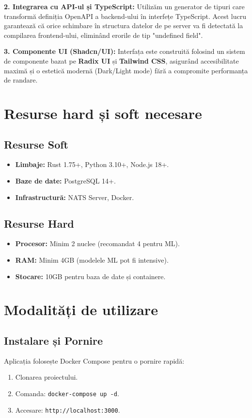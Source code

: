 \documentclass[12pt,a4paper]{article}
\begin{document}
	\textbf{2. Integrarea cu API-ul și TypeScript:}
	Utilizăm un generator de tipuri care transformă definiția OpenAPI a backend-ului în interfețe TypeScript. Acest lucru garantează că orice schimbare în structura datelor de pe server va fi detectată la compilarea frontend-ului, eliminând erorile de tip "undefined field".
	
	\textbf{3. Componente UI (Shadcn/UI):}
	Interfața este construită folosind un sistem de componente bazat pe \textbf{Radix UI} și \textbf{Tailwind CSS}, asigurând accesibilitate maximă și o estetică modernă (Dark/Light mode) fără a compromite performanța de randare.
	
	\newpage
	
	\section{Resurse hard și soft necesare}
	
	\subsection{Resurse Soft}
	\begin{itemize}
		\item \textbf{Limbaje:} Rust 1.75+, Python 3.10+, Node.js 18+.
		\item \textbf{Baze de date:} PostgreSQL 14+.
		\item \textbf{Infrastructură:} NATS Server, Docker.
	\end{itemize}
	
	\subsection{Resurse Hard}
	\begin{itemize}
		\item \textbf{Procesor:} Minim 2 nuclee (recomandat 4 pentru ML).
		\item \textbf{RAM:} Minim 4GB (modelele ML pot fi intensive).
		\item \textbf{Stocare:} 10GB pentru baza de date și containere.
	\end{itemize}
	
	\section{Modalități de utilizare}
	
	\subsection{Instalare și Pornire}
	Aplicația folosește Docker Compose pentru o pornire rapidă:
	\begin{enumerate}
		\item Clonarea proiectului.
		\item Comanda: \texttt{docker-compose up -d}.
		\item Accesare: \texttt{http://localhost:3000}.
	\end{enumerate}
	
\end{document}
